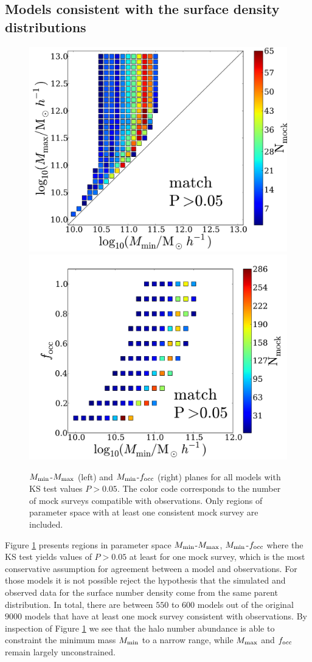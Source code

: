 \documentclass[usenatbib]{mn2e}
\begin{document}
{\subsection{Models consistent with the surface density distributions}

\begin{figure}
\begin{center}
\includegraphics[width=0.46\linewidth,angle=0]{Fig2_match_P5.pdf}
\vspace{5mm}
\includegraphics[width=0.49\linewidth,angle=0]{Fig3_match_P5.pdf}
\end{center} 
\caption{$M_{\rm min}$-$M_{\rm max}$ (left) and $M_{\rm    min}$-$f_{\rm
    occ}$ (right) planes for all models with  KS test values
  $P>0.05$. The color code corresponds to the number of mock surveys
  compatible with observations. Only regions of parameter  space with
  at least one consistent mock survey are  included. \label{fig:landscape}}     
\end{figure}


Figure \ref{fig:landscape} presents regions in parameter space $M_{\rm
min}$-$M_{\rm max}$, $M_{\rm min}$-$f_{\rm occ}$ where the KS test yields
values of $P>0.05$ at least for one mock survey, which is the most
conservative assumption for agreement between a model and observations. For those models it
is not possible reject the hypothesis that the simulated and observed
data for the surface number density come from the same parent
distribution. In total, there are between $550$ to $600$ models out of
the original $9000$ models that have at least one mock survey
consistent with observations. By inspection of Figure
\ref{fig:landscape} we see that the halo number abundance is able to
constraint the minimum mass $M_{\rm min}$ to a narrow range, while
$M_{\rm max}$ and $f_{\rm occ}$ remain largely unconstrained.

}
\end{document}
